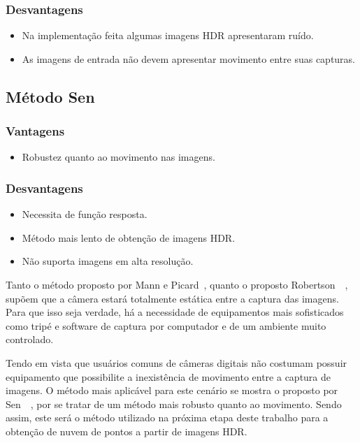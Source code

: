\subsubsection{Desvantagens}
\begin{itemize}
	\item Na implementação feita algumas imagens HDR apresentaram ruído.
	\item As imagens de entrada não devem apresentar movimento entre suas capturas.
\end{itemize}

\subsection{Método Sen} \label{discussaoSen}
\subsubsection{Vantagens}
\begin{itemize}
	\item Robustez quanto ao movimento nas imagens.
\end{itemize}
\subsubsection{Desvantagens}
\begin{itemize}
	\item Necessita de função resposta.
	\item Método mais lento de obtenção de imagens HDR.
	\item Não suporta imagens em alta resolução.
\end{itemize}

Tanto o método proposto por Mann e Picard~\cite{mann}, quanto o proposto Robertson~\etal~\cite{robertson}, supõem que a câmera estará totalmente estática entre a captura das imagens. Para que isso seja verdade, há a necessidade de equipamentos mais sofisticados como tripé e software de captura por computador e de um ambiente muito controlado. 

Tendo em vista que usuários comuns de câmeras digitais não costumam possuir equipamento que possibilite a inexistência de movimento entre a captura de imagens. O método mais aplicável para este cenário se mostra o proposto por Sen~\etal~\cite{hdrMovimento}, por se tratar de um método mais robusto quanto ao movimento. Sendo assim, este será o método utilizado na próxima etapa deste trabalho para a obtenção de nuvem de pontos a partir de imagens HDR.
